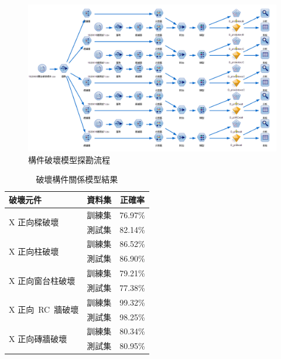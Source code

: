 \begin{figure}[hbtp]
  \begin{center}
    \includegraphics[width=1.0\textwidth]{figures/crack-flow.png}
    \caption{構件破壞模型探勘流程} 
    \label{fig:crack-flow}
  \end{center}
\end{figure}


\setlength{\tabcolsep}{2em}
{\renewcommand{\arraystretch}{1.5}
\begin{table}[hbtp]
  \begin{center}
    \caption{破壞構件關係模型結果}
    \label{tab:comp_result}
    \begin{tabular}{l c c}
    	\hline
    	破壞元件 & 資料集 & 正確率 \\
    	\hline
    	\multirow{2}{*}{X 正向樑破壞} & 訓練集 & 76.97\% \\
    	\cline{2-3} & 測試集 & 82.14\% \\
    	\hline
    	\multirow{2}{*}{X 正向柱破壞} & 訓練集 & 86.52\% \\
    	\cline{2-3} & 測試集 & 86.90\% \\
    	\hline
    	\multirow{2}{*}{X 正向窗台柱破壞} & 訓練集 & 79.21\% \\
    	\cline{2-3} & 測試集 & 77.38\% \\
    	\hline
    	\multirow{2}{*}{X 正向~RC~牆破壞} & 訓練集 & 99.32\% \\
    	\cline{2-3} & 測試集 & 98.25\% \\
    	\hline
    	\multirow{2}{*}{X 正向磚牆破壞} & 訓練集 & 80.34\% \\
    	\cline{2-3} & 測試集 & 80.95\% \\
    	\hline
    \end{tabular}
  \end{center}
\end{table}
}


